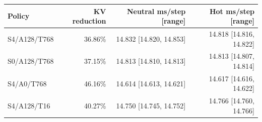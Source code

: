 \begin{tabular}{lrrr}
\toprule
Policy & KV reduction & Neutral ms/step [range] & Hot ms/step [range]\\\midrule
S4/A128/T768 & 36.86\% & 14.832 [14.820, 14.853] & 14.818 [14.816, 14.822] \\
S0/A128/T768 & 37.15\% & 14.813 [14.810, 14.813] & 14.813 [14.807, 14.814] \\
S4/A0/T768 & 46.16\% & 14.614 [14.613, 14.621] & 14.617 [14.616, 14.622] \\
S4/A128/T16 & 40.27\% & 14.750 [14.745, 14.752] & 14.766 [14.760, 14.766] \\
\bottomrule
\end{tabular}
